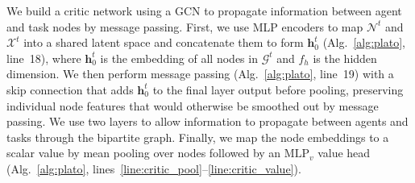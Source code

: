 
We build a critic network using a GCN \cite{kipf2016semi} to propagate information between agent and task nodes by message passing. First, we use MLP encoders to map $\mathcal{N}^t$ and $\mathcal{X}^t$ into a shared latent space and concatenate them to form $\mathbf{h}_0^t$ (Alg.~\ref{alg:plato}, line~18), where $\mathbf{h}_0^t$  is the embedding of all nodes in $\mathcal{G}^t$ and $f_h$ is the hidden dimension. We then perform message passing (Alg.~\ref{alg:plato}, line~19) with a skip connection \cite{he2016deep} that adds $\mathbf{h}_0^t$ to the final layer output before pooling, preserving individual node features that would otherwise be smoothed out by message passing. We use two layers to allow information to propagate between agents and tasks through the bipartite graph.
Finally, we map the node embeddings to a scalar value by mean pooling over nodes followed by an $\mathrm{MLP}_v$ value head (Alg.~\ref{alg:plato}, lines~\ref{line:critic_pool}--\ref{line:critic_value}).



